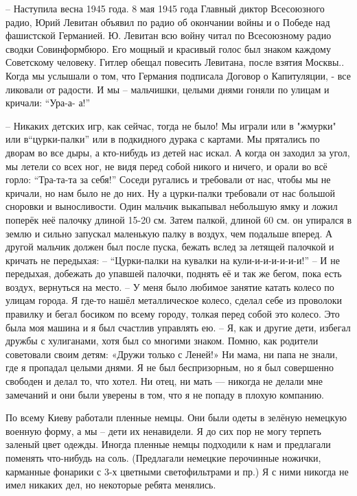 – Наступила весна 1945 года. 8 мая 1945 года Главный диктор Всесоюзного радио,
Юрий Левитан объявил по радио об окончании войны и о Победе над фашистской
Германией. Ю. Левитан всю войну читал по Всесоюзному радио сводки
Совинформбюро. Его мощный и красивый голос был знаком каждому Советскому
человеку.  Гитлер обещал повесить Левитана, после взятия Москвы.. Когда мы
услышали  о том, что Германия подписала Договор о Капитуляции, - все ликовали
от радости. И мы – мальчишки, целыми днями гоняли по улицам и кричали: “Ура-а-
а!”

– Никаких детских игр, как сейчас, тогда не было! Мы играли или в  "жмурки" или
в“цурки-палки” или в подкидного дурака с картами. Мы прятались по дворам во все
дыры, а кто-нибудь из детей нас искал. А когда он заходил за угол, мы летели со
всех ног, не видя перед собой никого и ничего, и орали во всё горло: “Тра-та-та
за себя!” Соседи ругались и требовали от нас, чтобы мы не кричали, но нам было
не до них. Ну а цурки-палки требовали от нас большой сноровки и  выносливости.
Один мальчик выкапывал небольшую ямку и ложил поперёк неё палочку длиной 15-20
см. Затем  палкой, длиной 60 см. он упирался в землю и сильно запускал
маленькую палку в воздух, чем подальше вперед. А другой мальчик должен был
после пуска,  бежать вслед за летящей палочкой и кричать не передыхая:
– “Цурки-палки на кувалки на кули-и-и-и-и-и-и!”
– И не передыхая, добежать до упавшей палочки, поднять её и так же бегом, пока есть воздух, вернуться на место. 
– У меня было любимое занятие катать колесо по улицам города. Я где-то нашёл металлическое колесо, сделал себе из проволоки правилку и бегал босиком по всему городу, толкая перед собой это колесо. Это была моя машина и я был счастлив управлять ею. 
– Я, как и другие дети, избегал дружбы с хулиганами, хотя был со многими знаком. Помню, как родители советовали своим детям: «Дружи только с Леней!» Ни мама, ни папа не знали, где я пропадал целыми днями. Я не был беспризорным, но я был совершенно свободен и делал то, что хотел. Ни отец, ни мать — никогда не делали мне замечаний и они были уверены в том, что я не попаду в плохую компанию.

По всему Киеву работали пленные немцы. Они были одеты в зелёную немецкую
военную форму, а мы – дети их ненавидели. Я до сих пор не могу терпеть заленый
цвет одежды. Иногда пленные немцы подходили к нам и предлагали поменять
что-нибудь на соль. (Предлагали немецкие перочинные ножички, карманные
фонарики с 3-х цветными светофильтрами и пр.) Я с ними никогда не имел никаких
дел, но некоторые ребята менялись. 

